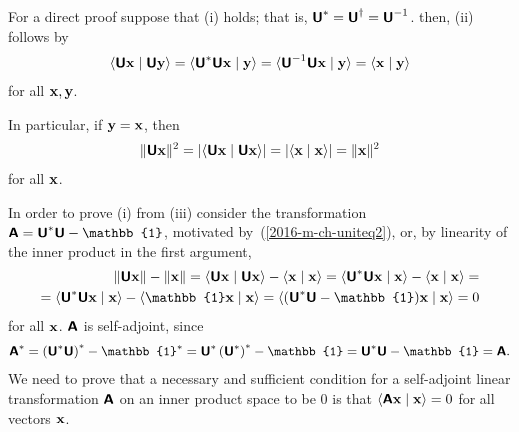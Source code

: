 {\color{OliveGreen}\bproof
For a direct proof
suppose that (i) holds; that is,
$\textsf{\textbf{U}}^\ast = \textsf{\textbf{U}}^\dagger =\textsf{\textbf{U}}^{-1}$.
then, (ii) follows by
\begin{equation}
\begin{split}
\langle \textsf{\textbf{U}}{\bf x}\mid \textsf{\textbf{U}}{\bf y} \rangle
=
\langle \textsf{\textbf{U}}^\ast\textsf{\textbf{U}}{\bf x}\mid {\bf y} \rangle
=
\langle \textsf{\textbf{U}}^{-1}\textsf{\textbf{U}}{\bf x}\mid {\bf y} \rangle
=
\langle {\bf x}\mid {\bf y} \rangle
\end{split}
\label{2016-m-ch-uniteq}
\end{equation}
for all ${\bf x}, {\bf y}$.

In particular, if ${\bf y} = {\bf x}$, then
\begin{equation}
\begin{split}
\| \textsf{\textbf{U}}{\bf x}\|^2 =
\vert \langle \textsf{\textbf{U}}{\bf x}\mid \textsf{\textbf{U}}{\bf x} \rangle \vert
=
\vert \langle {\bf x}\mid {\bf x} \rangle \vert
=
\|{\bf x}\|^2
\end{split}
\label{2016-m-ch-uniteq2}
\end{equation}
for all ${\bf x}$.

In order to prove (i) from (iii) consider the transformation
$\textsf{\textbf{A}} = \textsf{\textbf{U}}^\ast\textsf{\textbf{U}} - \mathbb{1}$, motivated by~(\ref{2016-m-ch-uniteq2}),
or, by linearity of the inner product in the first argument,
\begin{equation}
\begin{split}
\| \textsf{\textbf{U}}{\bf x}\| - \|{\bf x}\|
= \langle \textsf{\textbf{U}}{\bf x}\mid \textsf{\textbf{U}}{\bf x} \rangle
-
 \langle {\bf x}\mid {\bf x} \rangle  =
\langle \textsf{\textbf{U}}^\ast \textsf{\textbf{U}}{\bf x}\mid {\bf x} \rangle
-
 \langle {\bf x}\mid {\bf x} \rangle=        \\   =
\langle \textsf{\textbf{U}}^\ast \textsf{\textbf{U}}{\bf x}\mid {\bf x} \rangle
-
 \langle \mathbb{1}{\bf x}\mid {\bf x} \rangle  =
 \langle (\textsf{\textbf{U}}^\ast \textsf{\textbf{U}} - \mathbb{1}){\bf x}\mid {\bf x} \rangle
=
0
\end{split}
\end{equation}
for all ${\bf x}$.
$\textsf{\textbf{A}}$ is self-adjoint, since
\begin{equation}
\begin{split}
\textsf{\textbf{A}}^\ast  =\left( \textsf{\textbf{U}}^\ast \textsf{\textbf{U}} \right)^\ast - \mathbb{1}^\ast
=\textsf{\textbf{U}}^\ast \left(\textsf{\textbf{U}}^\ast \right)^\ast - \mathbb{1} =
\textsf{\textbf{U}}^\ast \textsf{\textbf{U}} - \mathbb{1} =\textsf{\textbf{A}}
.
\end{split}
\label{2016-m-ch-uniteq3}
\end{equation}
We need to prove
that a necessary and sufficient condition for a self-adjoint linear
transformation $\textsf{\textbf{A}}$
on an inner product space to be $0$ is that $\langle \textsf{\textbf{A}}{\bf x} \mid {\bf x} \rangle = 0$ for
all vectors ${\bf x}$.

}

